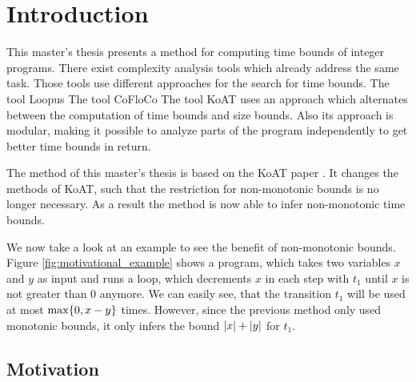 \section{Introduction}

This master's thesis presents a method for computing time bounds of integer programs.
There exist complexity analysis tools which already address the same task.
Those tools use different approaches for the search for time bounds.
The tool Loopus \cite{loopus1} \cite{loopus2} 
The tool CoFloCo \cite{cofloco1} \cite{cofloco2} \cite{cofloco3} \cite{cofloco4} 
The tool KoAT \cite{koat} uses an approach which alternates between the computation of time bounds and size bounds.
Also its approach is modular, making it possible to analyze parts of the program independently to get better time bounds in return.

The method of this master's thesis is based on the KoAT paper \cite{koat}.
It changes the methods of KoAT, such that the restriction for non-monotonic bounds is no longer necessary.
As a result the method is now able to infer non-monotonic time bounds.

We now take a look at an example to see the benefit of non-monotonic bounds.
Figure \ref{fig:motivational_example} shows a program, which takes two variables $x$ and $y$ as input and runs a loop, which decrements $x$ in each step with $t_1$ until $x$ is not greater than 0 anymore.
We can easily see, that the transition $t_1$ will be used at most $\max \lbrace 0, x-y \rbrace$ times.
However, since the previous method only used monotonic bounds, it only infers the bound $\left|x\right|+\left|y\right|$ for $t_1$.


\subsection{Motivation}





